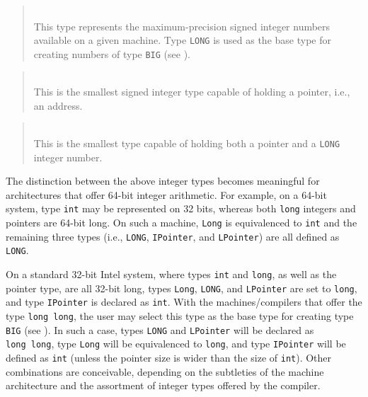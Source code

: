 \begin{quote}
\noindent{}\\ \hspace{0in}
This type represents the maximum-precision signed
integer numbers available on a given machine.
Type {\tt LONG} is used as the base type for creating numbers of type {\tt BIG}
(see ).
\end{quote}

\begin{quote}
\noindent{}\\ \hspace{0in}
This is the smallest signed integer type capable of holding a pointer, i.e., an
address.
\end{quote}

\begin{quote}
\noindent{}\\ \hspace{0in}
This is the smallest type capable of holding both a pointer and a {\tt LONG} integer
number.
\end{quote}\medskip

The distinction between the above integer types becomes meaningful for 
architectures that offer 64-bit integer arithmetic.
For example, on a 64-bit system, type {\tt int} may be
represented on 32 bits, whereas
both {\tt long} integers and pointers are 64-bit long.
On such a machine, {\tt Long} is equivalenced to {\tt int} and the remaining
three types (i.e., {\tt LONG}, {\tt IPointer}, and {\tt LPointer}) are all
defined as {\tt LONG}.

On a standard 32-bit Intel system,
where types {\tt int} and {\tt long}, as well as the pointer
type, are all 32-bit long, types {\tt Long}, {\tt LONG}, and {\tt LPointer}
are set to {\tt long}, and type {\tt IPointer} is declared as {\tt int}.
With the machines/compilers that offer the type {\tt long~long}, the user may select
this type as the base type for creating type {\tt BIG} (see ).
In such a case, types {\tt LONG} and {\tt LPointer} will be declared as
{\tt long~long}, type {\tt Long} will be equivalenced to {\tt long}, and type
{\tt IPointer} will be defined as {\tt int} (unless the pointer size is wider
than the size of {\tt int}).
Other combinations are conceivable, depending on the subtleties of the machine
architecture and the assortment of integer types offered by the compiler.

